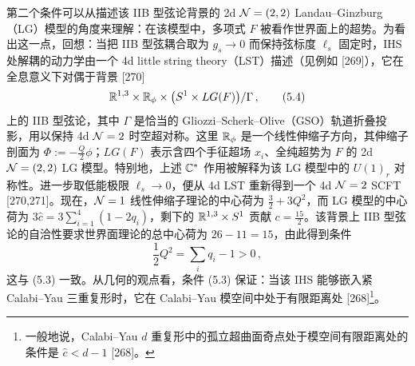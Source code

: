 第二个条件可以从描述该 IIB 型弦论背景的 2d $\mathcal{N}=(2,2)$ Landau--Ginzburg（LG）模型的角度来理解：在该模型中，多项式 $F$ 被看作世界面上的超势。为看出这一点，回想：当把 IIB 型弦耦合取为 $g_s\to0$ 而保持弦标度 $\ell_s$ 固定时，IHS 处解耦的动力学由一个 4d little string theory（LST）描述（见例如 [269]），它在全息意义下对偶于背景 [270]
\begin{equation}
  \mathbb{R}^{1,3}\times \mathbb{R}_{\phi}\times \bigl(S^1\times LG(F)\bigr)/\Gamma \,,
  \tag{5.4}
\end{equation}
上的 IIB 型弦论，其中 $\Gamma$ 是恰当的 Gliozzi--Scherk--Olive（GSO）轨道折叠投影，用以保持 4d $\mathcal{N}=2$ 时空超对称。这里 $\mathbb{R}_{\phi}$ 是一个线性伸缩子方向，其伸缩子剖面为 $\Phi:=-\tfrac{Q}{2}\phi$；$LG(F)$ 表示含四个手征超场 $x_i$、全纯超势为 $F$ 的 2d $\mathcal{N}=(2,2)$ LG 模型。特别地，上述 $\mathbb{C}^*$ 作用被解释为该 LG 模型中的 $U(1)_r$ 对称性。进一步取低能极限 $\ell_s\to0$，便从 4d LST 重新得到一个 4d $\mathcal{N}=2$ SCFT [270,271]。现在，$\mathcal{N}=1$ 线性伸缩子理论的中心荷为 $\tfrac{3}{2}+3Q^2$，而 LG 模型的中心荷为 $3\hat c=3\sum_{i=1}^{4}(1-2q_i)$，剩下的 $\mathbb{R}^{1,3}\times S^1$ 贡献 $c=\tfrac{15}{2}$。该背景上 IIB 型弦论的自洽性要求世界面理论的总中心荷为 $26-11=15$，由此得到条件
\begin{equation}
  \frac{1}{2}Q^2 = \sum_i q_i - 1 > 0 \,,
  \tag{5.5}
\end{equation}
这与 (5.3) 一致。从几何的观点看，条件 (5.3) 保证：当该 IHS 能够嵌入紧 Calabi--Yau 三重复形时，它在 Calabi--Yau 模空间中处于有限距离处 [268]\footnote{一般地说，Calabi--Yau $d$ 重复形中的孤立超曲面奇点处于模空间有限距离处的条件是 $\hat c<d-1$ [268]。}。


